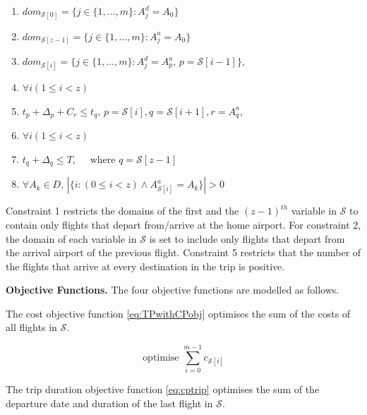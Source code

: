\documentclass{mpaper}
\begin{document}
\begin{enumerate}
\item
$dom_{\mathcal{S}[0]} = \{j \in \{1,...,m\} : A^{d}_{j} = A_{0}\}$
\item[]
$dom_{\mathcal{S}[z-1]} = \{j \in \{1,...,m\} : A^{a}_{j} = A_{0}\}$
\item
$dom_{\mathcal{S}[i]} = \{j \in \{1,...,m\} : A^{d}_{j} = A^{a}_{p}, \, p = \mathcal{S}[i-1]\},$
\item[]
$\forall i (1 \leq i < z)$
\item
$t_{p} + \Delta_{p} + C_{r} \leq t_{q}, \, p = \mathcal{S}[i], q = \mathcal{S}[i+1], r = A^{a}_{q},$
\item[]
$\forall i (1 \leq i < z)$
\item
$t_{q} + \Delta_{q} \leq T, \quad \textrm{ where } q = \mathcal{S}[z-1]$
\item
$\forall A_{k} \in D, \, |\{i: (0 \leq i < z) \wedge A^{a}_{\mathcal{S}[i]} = A_{k} \}| > 0 $
\end{enumerate}

Constraint 1 restricts the domains of the first and the $(z-1)^{th}$ variable in $\mathcal{S}$ to contain only flights that depart from/arrive at the home airport. For constraint 2, the domain of each variable in $\mathcal{S}$ is set to include only flights that depart from the arrival airport of the previous flight. Constraint 5 restricts that the number of the flights that arrive at every destination in the trip is positive. %

\textbf{Objective Functions.} The four objective functions are modelled as follows.

The cost objective function \ref{eq:TPwithCPobj} optimises the sum of the costs of all flights in $\mathcal{S}$.

\vspace{-1mm}
\begin{equation}
\label{eq:TPwithCPobj}
\textrm{optimise }\sum^{m-1}_{i = 0} c_{\mathcal{S}[i]}
\end{equation}
\vspace{-1mm}

The trip duration objective function \ref{eq:cptrip} optimises the sum of the departure date and duration of the last flight in $\mathcal{S}$.
\end{document}
